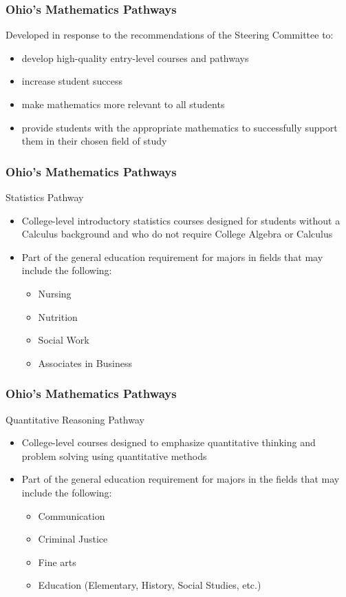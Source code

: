 \documentclass[13pt]{beamer}
\newcounter{a}
\newcounter{b}
\begin{document}
\begin{frame}
  \frametitle{Ohio's Mathematics Pathways}

  Developed in response to the recommendations of the Steering Committee to:

  \begin{itemize}
  \item develop high-quality entry-level courses and pathways
  \item increase student success
  \item make mathematics more relevant to all students
  \item provide students with the appropriate mathematics to successfully support them in their chosen field of study
  \end{itemize}
  
\end{frame}

\begin{frame}
  \frametitle{Ohio's Mathematics Pathways}

  Statistics Pathway %

  \begin{itemize}
  \item College-level introductory statistics courses designed for students without a Calculus background and who do not require College Algebra or Calculus
  \item Part of the general education requirement for majors in fields that may include the following:
    \begin{itemize}
      \item Nursing
      \item Nutrition
      \item Social Work
      \item Associates in Business
    \end{itemize}
  \end{itemize}
\end{frame}

\begin{frame}
  \frametitle{Ohio's Mathematics Pathways}
    Quantitative Reasoning Pathway %

    \begin{itemize}
    \item College-level courses designed to emphasize quantitative thinking and problem solving using quantitative methods
    \item Part of the general education requirement for majors in the fields that may include the following:
      \begin{itemize}
      \item Communication
      \item Criminal Justice
      \item Fine arts
      \item Education (Elementary, History, Social Studies, etc.)
      \end{itemize}
    \end{itemize}
\end{frame}
\end{document}
